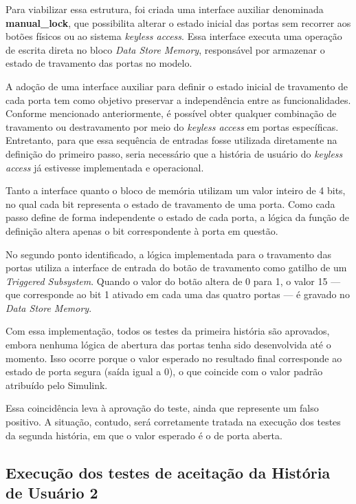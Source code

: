 Para viabilizar essa estrutura, foi criada uma interface auxiliar denominada \textbf{manual\_lock}, que possibilita alterar o estado inicial das portas sem recorrer aos 
botões físicos ou ao sistema \textit{keyless access}. Essa interface executa uma operação de escrita direta no bloco \textit{Data Store Memory}, responsável por armazenar o 
estado de travamento das portas no modelo.

A adoção de uma interface auxiliar para definir o estado inicial de travamento de cada porta tem como objetivo preservar a independência entre as funcionalidades. 
Conforme mencionado anteriormente, é possível obter qualquer combinação de travamento ou destravamento por meio do \textit{keyless access} em portas específicas. 
Entretanto, para que essa sequência de entradas fosse utilizada diretamente na definição do primeiro passo, seria necessário que a história de usuário do 
\textit{keyless access} já estivesse implementada e operacional.

Tanto a interface quanto o bloco de memória utilizam um valor inteiro de 4 bits, no qual cada bit representa o estado de travamento de uma porta. Como cada passo 
define de forma independente o estado de cada porta, a lógica da função de definição altera apenas o bit correspondente à porta em questão.

No segundo ponto identificado, a lógica implementada para o travamento das portas utiliza a interface de entrada do botão de travamento como gatilho de um 
\textit{Triggered Subsystem}. Quando o valor do botão altera de 0 para 1, o valor 15 — que corresponde ao bit 1 ativado em cada uma das quatro portas — é gravado 
no \textit{Data Store Memory}.

Com essa implementação, todos os testes da primeira história são aprovados, embora nenhuma lógica de abertura das portas tenha sido desenvolvida até o momento. Isso 
ocorre porque o valor esperado no resultado final corresponde ao estado de porta segura (saída igual a 0), o que coincide com o valor padrão atribuído pelo Simulink.

Essa coincidência leva à aprovação do teste, ainda que represente um falso positivo. A situação, contudo, será corretamente tratada na execução dos testes da segunda 
história, em que o valor esperado é o de porta aberta.


\subsection{Execução dos testes de aceitação da História de Usuário 2}

